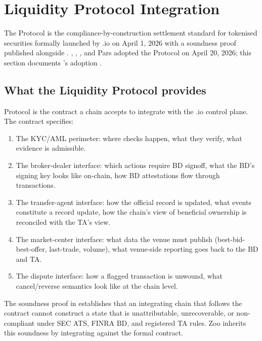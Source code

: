 \section{Liquidity Protocol Integration}
\label{sec:liquidity-integration}

The \Liquidity{} Protocol is the compliance-by-construction settlement
standard for tokenised securities formally launched by \Liquidity{}.io
on April 1, 2026 with a soundness proof published alongside
\cite{liquidity-protocol-formal}. \Lux{}, \Hanzo{}, \Zoo{}, and Pars
adopted the \Liquidity{} Protocol on April 20, 2026; this section
documents \Zoo{}'s adoption \cite{zoo-adopts-liquidity-protocol}.

\subsection{What the Liquidity Protocol provides}

\Liquidity{} Protocol is the contract a chain accepts to integrate
with the \Liquidity{}.io control plane. The contract specifies:

\begin{enumerate}[leftmargin=1.4em]
  \item The KYC/AML perimeter: where checks happen, what they verify,
        what evidence is admissible.
  \item The broker-dealer interface: which actions require BD
        signoff, what the BD's signing key looks like on-chain, how
        BD attestations flow through transactions.
  \item The transfer-agent interface: how the official record is
        updated, what events constitute a record update, how the
        chain's view of beneficial ownership is reconciled with the
        TA's view.
  \item The market-center interface: what data the venue must
        publish (best-bid-best-offer, last-trade, volume), what
        venue-side reporting goes back to the BD and TA.
  \item The dispute interface: how a flagged transaction is unwound,
        what cancel/reverse semantics look like at the chain level.
\end{enumerate}

The soundness proof in \cite{liquidity-protocol-formal} establishes
that an integrating chain that follows the contract cannot construct
a state that is unattributable, unrecoverable, or non-compliant
under SEC ATS, FINRA BD, and registered TA rules. Zoo inherits this
soundness by integrating against the formal contract.

